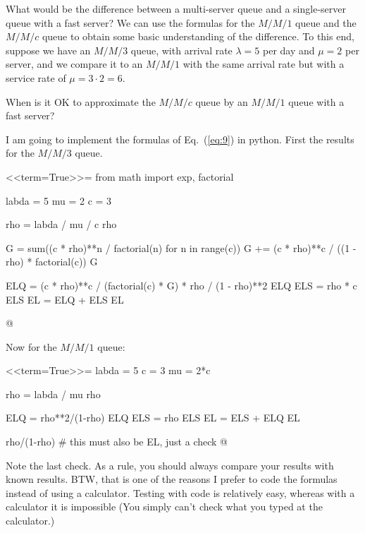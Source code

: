 \begin{question}
  What would be the difference between a multi-server queue and a
  single-server queue with a fast server? We can use the formulas for
  the $M/M/1$ queue and the $M/M/c$ queue to obtain some basic
  understanding of the difference. To this end, suppose we have an
  $M/M/3$ queue, with arrival rate $\lambda = 5$ per day and $\mu=2$
  per server, and we compare it to an $M/M/1$ with the same arrival
  rate but with a service rate of $\mu = 3\cdot 2 = 6$. 


 When is it OK to approximate the $M/M/c$ queue by an $M/M/1$
    queue with a fast server?

  \begin{solution}

I am going to implement the formulas of Eq.~(\ref{eq:9}) in python. First the results for the $M/M/3$ queue.

<<term=True>>=
from math import exp, factorial

labda = 5
mu = 2
c = 3

rho = labda / mu / c
rho

G = sum((c * rho)**n / factorial(n) for n in range(c))
G += (c * rho)**c / ((1 - rho) * factorial(c))
G

ELQ = (c * rho)**c / (factorial(c) * G) * rho / (1 - rho)**2
ELQ
ELS = rho * c
ELS
EL = ELQ + ELS
EL

@

Now for the $M/M/1$ queue:

<<term=True>>=
labda = 5
c = 3
mu = 2*c

rho = labda / mu 
rho

ELQ = rho**2/(1-rho)
ELQ
ELS = rho
ELS
EL = ELS + ELQ
EL

rho/(1-rho) # this must also be EL, just a check
@

Note the last check. As a rule, you should always compare your results
with known results. BTW, that is one of the reasons I prefer to code
the formulas instead of using a calculator. Testing with code is
relatively easy, whereas with a calculator it is impossible (You
simply can't check what you typed at the calculator.)


\end{solution}
\end{question}
